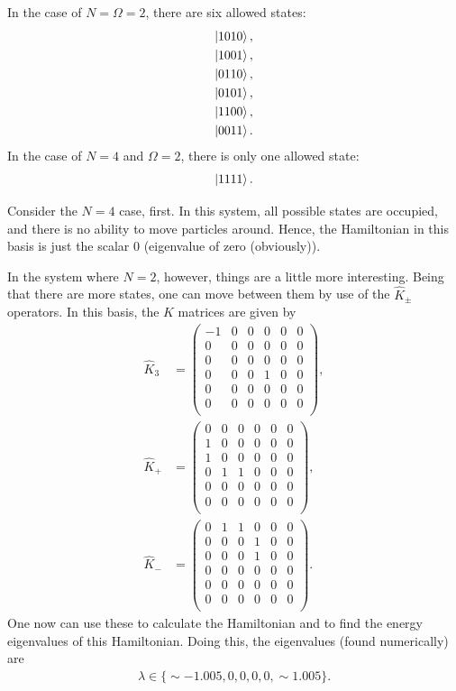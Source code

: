 \documentclass[
a4paper,
10pt,
twoside,
]{article}
\begin{document}
In the case of $N=\Omega=2$, there are six allowed states:
\begin{align*}
	\ket{1010}, \\
	\ket{1001}, \\
	\ket{0110}, \\
	\ket{0101}, \\
	\ket{1100}, \\
	\ket{0011}. 
\end{align*}
In the case of $N=4$ and $\Omega = 2$, there is only one allowed state:
\begin{align*}
	\ket{1111}.
\end{align*}

Consider the $N=4$ case, first.
In this system, all possible states are occupied, and there is no ability to move particles around.
Hence, the Hamiltonian in this basis is just the scalar $0$ (eigenvalue of zero (obviously)).

In the system where $N=2$, however, things are a little more interesting.
Being that there are more states, one can move between them by use of the $\hat{K}_\pm$ operators.
In this basis, the $\hat{K}$ matrices are given by
\begin{align*}
	\hat{K}_3 &= 
	\begin{pmatrix}
		-1 & 0 & 0 & 0 & 0 & 0 \\
		 0 & 0 & 0 & 0 & 0 & 0 \\
		 0 & 0 & 0 & 0 & 0 & 0 \\
		 0 & 0 & 0 & 1 & 0 & 0 \\
		 0 & 0 & 0 & 0 & 0 & 0 \\
		 0 & 0 & 0 & 0 & 0 & 0 \\
	\end{pmatrix}, \\
	\hat{K}_+ &= 
	\begin{pmatrix}
		 0 & 0 & 0 & 0 & 0 & 0 \\
		 1 & 0 & 0 & 0 & 0 & 0 \\
		 1 & 0 & 0 & 0 & 0 & 0 \\
		 0 & 1 & 1 & 0 & 0 & 0 \\
		 0 & 0 & 0 & 0 & 0 & 0 \\
		 0 & 0 & 0 & 0 & 0 & 0 \\
	\end{pmatrix}, \\
	\hat{K}_- &= 
	\begin{pmatrix}
		 0 & 1 & 1 & 0 & 0 & 0 \\
		 0 & 0 & 0 & 1 & 0 & 0 \\
		 0 & 0 & 0 & 1 & 0 & 0 \\
		 0 & 0 & 0 & 0 & 0 & 0 \\
		 0 & 0 & 0 & 0 & 0 & 0 \\
		 0 & 0 & 0 & 0 & 0 & 0 \\
	\end{pmatrix} .
\end{align*}
One now can use these to calculate the Hamiltonian and to find the energy eigenvalues of this Hamiltonian.
Doing this, the eigenvalues (found numerically) are
\begin{align}
	\lambda \in \{\sim -1.005,0,0,0,0,\sim 1.005\}.
\end{align}
\end{document}
